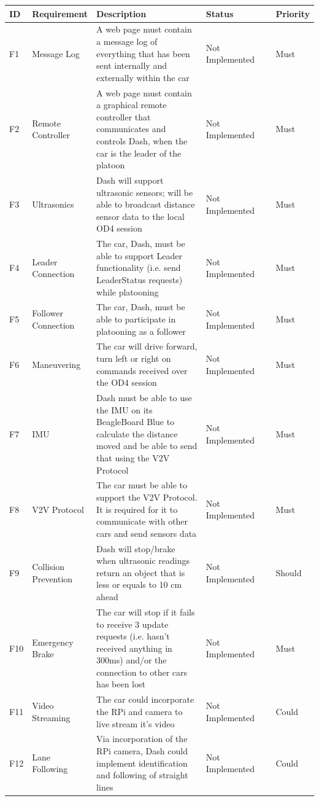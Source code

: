 \documentclass[12pt]{article}
\begin{document}
\begin{longtable}{| p{0.05\linewidth} | p{0.15\linewidth} | p{0.45\linewidth} | p{0.25\linewidth} | p{0.1\linewidth} |}\hline 
    ID & Requirement & Description & Status & Priority \\ \hline
    F1 & Message Log & A web page must contain a message log of everything that has been sent internally and externally within the car & Not Implemented & Must\\ \hline
    F2 & Remote Controller & A web page must contain a graphical remote controller that communicates and controls Dash, when the car is the leader of the platoon & Not Implemented & Must\\ \hline
    F3 & Ultrasonics & Dash will support ultrasonic sensors; will be able to broadcast distance sensor data to the local OD4 session & Not Implemented & Must\\ \hline
    F4 & Leader Connection & The car, Dash, must be able to support Leader functionality (i.e. send LeaderStatus requests) while platooning & Not Implemented & Must\\ \hline       
    F5 & Follower Connection & The car, Dash, must be able to participate in platooning as a follower & Not Implemented & Must\\ \hline
    F6 & Maneuvering & The car will drive forward, turn left or right on commands received over the OD4 session & Not Implemented & Must\\ \hline
    F7 & IMU & Dash must be able to use the IMU on its BeagleBoard Blue to calculate the distance moved and be able to send that using the V2V Protocol & Not Implemented & Must\\ \hline
    F8 & V2V Protocol & The car must be able to support the V2V Protocol. It is required for it to communicate with other cars and send sensors data & Not Implemented & Must\\ \hline
    F9 & Collision Prevention & Dash will stop/brake when ultrasonic readings return an object that is less or equals to 10 cm ahead & Not Implemented & Should\\ \hline
    F10 & Emergency Brake & The car will stop if it fails to receive 3 update requests (i.e. hasn’t received anything in 300ms) and/or the connection to other cars has been lost & Not Implemented & Must\\ \hline
    F11 & Video Streaming& The car could incorporate the RPi and camera to live stream it’s video & Not Implemented & Could\\ \hline
    F12 & Lane Following & Via incorporation of the RPi camera, Dash could implement identification and following of straight lines & Not Implemented & Could\\ \hline
\end{longtable}
\end{document}
